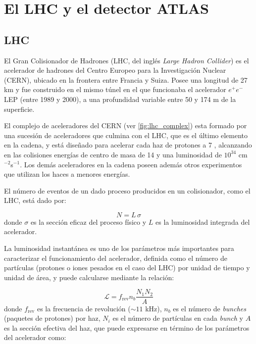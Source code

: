 \chapter{El LHC y el detector ATLAS}
\label{cap:detector}

\section{LHC}

El Gran Colisionador de Hadrones (LHC, del inglés \emph{Large Hadron Collider})
\cite{Evans:1129806} es el acelerador de hadrones del Centro Europeo para la
Investigación Nuclear (CERN), ubicado en la frontera entre Francia y Suiza.
Posee una longitud de 27 km y fue construido en el mismo túnel en el que
funcionaba el acelerador $e^{+}e^{-}$ LEP \cite{LEP} (entre 1989 y 2000), a una
profundidad variable entre 50 y 174 m de la superficie.

El complejo de aceleradores del CERN (ver \cref{fig:lhc_complex}) esta formado
por una sucesión de aceleradores que culmina con el LHC, que es
el último elemento en la cadena, y está diseñado para acelerar cada haz de
protones a 7 \tev, alcanzando en las colisiones energías de centro de masa de
14 \tev y una luminosidad de $10^{34}$ cm$^{-2}$s$^{-1}$. Los demás
aceleradores en la cadena poseen además otros experimentos que utilizan los
haces a menores energías.

El número de eventos de un dado proceso producidos en un colisionador, como el LHC, está dado
por:

\begin{equation}
  N = L \, \sigma
\end{equation}
%
donde $\sigma$ es la sección eficaz del proceso físico y $L$ es la luminosidad integrada del
acelerador.

La luminosidad instantánea es uno de los parámetros más importantes para
caracterizar el funcionamiento del acelerador, definida como el número de
partículas (protones o iones pesados en el caso del LHC) por unidad de tiempo y unidad de
área, y puede calcularse mediante la relación:

\begin{equation}
  \mathcal{L} = f_\text{rev} n_b \frac{N_1 N_2}{A}
\end{equation}
%
donde $f_\text{rev}$ es la frecuencia de revolución ($\sim 11$ kHz), $n_b$ es el número de
\emph{bunches} (paquetes de protones) por haz, $N_i$ es el número de partículas
en cada \emph{bunch} y $A$ es la sección efectiva del haz, que puede expresarse en
término de los parámetros del acelerador como:

